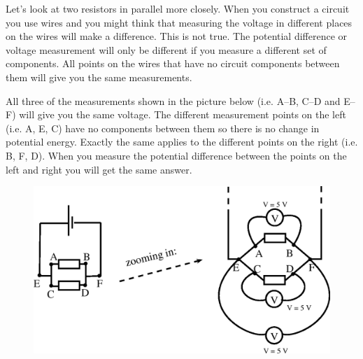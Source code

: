         \par 
        \label{m38776*id64033}Let's look at two resistors in parallel more closely. When you construct a circuit you use wires and you might think that measuring the voltage in different places on the wires will make a difference. This is not true. The potential difference or voltage measurement will only be different if you measure a different set of components. All points on the wires that have no circuit components between them will give you the same measurements.\par 
        \label{m38776*id64040}All three of the measurements shown in the picture below (i.e. A--B, C--D and E--F) will give you the same voltage. The different measurement points on the left (i.e. A, E, C) have no components between them so there is no change in potential energy.
Exactly the same applies to the different points on the right (i.e. B, F, D). When you measure the potential difference between the points on the left and right you will get the same answer.\par 
        \label{m38776*id64049}
          
    \setcounter{subfigure}{0}


	\begin{figure}[H] %
    \begin{center}
    \label{m38776*id64052!!!underscore!!!media}\label{m38776*id64052!!!underscore!!!printimage}\includegraphics{col11305.imgs/m38776_PG10C9_017.png} %
        
      \vspace{2pt}
    \vspace{.1in}
    
    \end{center}

 \end{figure}   

